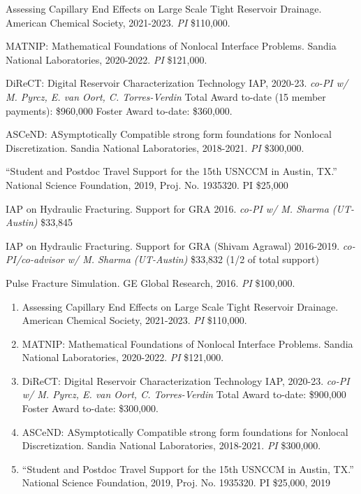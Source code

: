 \begin{etaremune}
    \item Assessing Capillary End Effects on Large Scale Tight Reservoir Drainage.  American Chemical Society, 2021-2023. \textit{PI} \$110,000.
    \item MATNIP: Mathematical Foundations of Nonlocal Interface Problems. Sandia National Laboratories, 2020-2022. \textit{PI} \$121,000. 
    \item DiReCT: Digital Reservoir Characterization Technology IAP, 2020-23. \textit{co-PI w/ M. Pyrcz, E. van Oort, C. Torres-Verdin} Total Award to-date (15 member payments): \$960,000 Foster Award to-date: \$360,000.
    \item ASCeND: ASymptotically Compatible strong form foundations for Nonlocal Discretization. Sandia National Laboratories, 2018-2021. \textit{PI} \$300,000.
    \item ``Student and Postdoc Travel Support for the 15th USNCCM in Austin, TX.''  National Science Foundation, 2019, Proj. No. 1935320. PI \$25,000
  \item IAP on Hydraulic Fracturing.  Support for GRA 2016. \textit{co-PI w/ M. Sharma (UT-Austin)} \$33,845
  \item IAP on Hydraulic Fracturing.  Support for GRA (Shivam Agrawal) 2016-2019. \textit{co-PI/co-advisor w/ M. Sharma (UT-Austin)} \$33,832 (1/2 of total support)
    \item Pulse Fracture Simulation. GE Global Research, 2016. \textit{PI} \$100,000.
\else
\begin{enumerate}
\fi
    \item Assessing Capillary End Effects on Large Scale Tight Reservoir Drainage.  American Chemical Society, 2021-2023. \textit{PI} \$110,000.
  \item MATNIP: Mathematical Foundations of Nonlocal Interface Problems. Sandia National Laboratories, 2020-2022. \textit{PI} \$121,000. 
    \item DiReCT: Digital Reservoir Characterization Technology IAP, 2020-23. \textit{co-PI w/ M. Pyrcz, E. van Oort, C. Torres-Verdin} Total Award to-date: \$900,000 Foster Award to-date: \$300,000.
  \item ASCeND: ASymptotically Compatible strong form foundations for Nonlocal Discretization. Sandia National Laboratories, 2018-2021. \textit{PI} \$300,000.
    \item ``Student and Postdoc Travel Support for the 15th USNCCM in Austin, TX.''  National Science Foundation, 2019, Proj. No. 1935320. PI \$25,000, 2019

\end{enumerate}
\end{etaremune}
